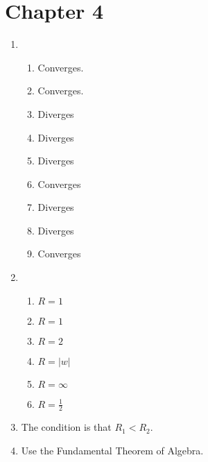 \section{Chapter 4}

\begin{enumerate}
	\item \begin{enumerate}
		\item Converges.
		\item Converges.
		\item Diverges
		\item Diverges
		\item Diverges
		\item Converges
		\item Diverges
		\item Diverges
		\item Converges
		
	\end{enumerate}
	
	\item \begin{enumerate}
		\item $R = 1$
		\item $R = 1$
		\item $R = 2$
		\item $R = |w|$
		\item $R = \infty$
		\item $R = \frac{1}{2}$		
	\end{enumerate}
	
	\item The condition is that $R_1 < R_2$.
	
	\item Use the Fundamental Theorem of Algebra.
	

\end{enumerate}
